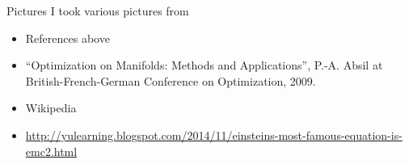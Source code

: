 \documentclass[xcolor=dvipsnames,t]{beamer} %
\begin{document}
\begin{frame}
\end{frame}


\begin{frame}{Pictures}
   I took various pictures from
   
   \begin{itemize}
      \item References above 
      \item ``Optimization on Manifolds: Methods and Applications'', P.-A. Absil at British-French-German Conference on Optimization, 2009.
      \item Wikipedia
      \item \url{http://yulearning.blogspot.com/2014/11/einsteins-most-famous-equation-is-emc2.html}
   \end{itemize}

\end{frame}
\end{document}
